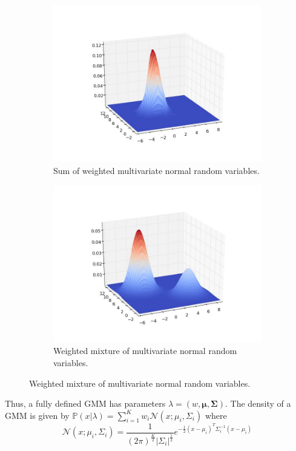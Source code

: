 \begin{figure}[h]
\centering
	\begin{subfigure}[b]{.49\textwidth}
		\centering
		\includegraphics[width=\textwidth]{sum.jpeg}
		\caption{Sum of weighted multivariate normal random variables.}
	\end{subfigure}
	\begin{subfigure}[b]{.49\textwidth}
		\centering
		\includegraphics[width=\textwidth]{gmm.jpeg}
		\caption{Weighted mixture of multivariate normal random variables.}
	\end{subfigure}
	\label{threedplots}
\end{figure}

Thus, a fully defined GMM has parameters $\lambda = \left( w, \mathbf{\mu}, \mathbf{\Sigma} \right).$ The density of a GMM is given by $\mathbb{P}(x | \lambda) = \sum_{i=1}^{K} w_{i} \mathcal{N}(x ; \mu_{i}, \Sigma_{i})$ where
\begin{equation*}
\mathcal{N}(x ; \mu_{i}, \Sigma_{i}) = \frac{1}{(2\pi)^{\frac{K}{2}} |\Sigma_{i}|^{\frac{1}{2}}} e^{-\frac{1}{2} \left(x - \mu_{i} \right)^{T} \Sigma_{i}^{-1} \left(x - \mu_{i} \right)}
\end{equation*}

